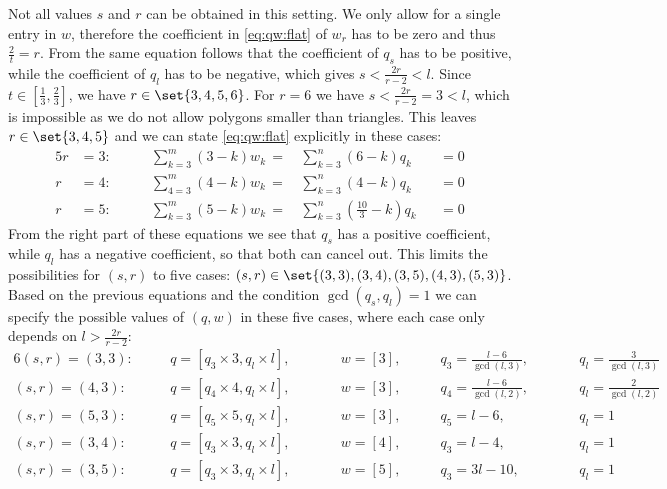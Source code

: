 Not all values $s$ and $r$ can be obtained in this setting. We only allow for a single entry in $w$, therefore the coefficient in \eqref{eq:qw:flat} of $w_r$ has to be zero and thus $\frac{2}{t} = r$. From the same equation follows that the coefficient of $q_s$ has to be positive, while the coefficient of $q_l$ has to be negative, which gives $s < \frac{2r}{r - 2} < l$. Since $t \in \left[\frac{1}{3}, \frac{2}{3}\right]$, we have $r \in \set{3, 4, 5, 6}$. For $r = 6$ we have $s < \frac{2r}{r - 2} = 3 < l$, which is impossible as we do not allow polygons smaller than triangles. This leaves $r \in \set{3, 4, 5}$ and we can state \eqref{eq:qw:flat} explicitly in these cases:
\begin{alignat}{5}
  r &= 3: \qquad &  \sum_{k=3}^m \left(3 - k \right) w_k\,=\,&    \sum_{k=3}^n \left(6 - k \right) q_k &&= 0 \label{eq:flat:3}\\
  r &= 4: \qquad &  \sum_{4=3}^m \left(4 - k \right) w_k\,=\,&    \sum_{k=3}^n \left(4 - k \right) q_k &&= 0  \label{eq:flat:4}\\
  r &= 5: \qquad &  \sum_{k=3}^m \left(5 - k \right) w_k\,=\,&    \sum_{k=3}^n \left( \tfrac{10}{3} - k \right) q_k &&= 0 \label{eq:flat:5}
\end{alignat}
From the right part of these equations we see that $q_s$ has a positive coefficient, while $q_l$ has a negative coefficient, so that both can cancel out. This limits the possibilities for $(s, r)$ to five cases: $(s, r) \in \set{(3, 3), (3, 4), (3, 5), (4, 3), (5, 3)}$. Based on the previous equations and the condition $\gcd(q_s, q_l) = 1$ we can specify the possible values of $(q, w)$ in these five cases, where each case only depends on $l > \frac{2r}{r - 2}$:
\begin{alignat*}{6}
  (s, r) = (3, 3): \quad && q = [q_3 \times 3, q_l \times l],\qquad&&w = [3],\qquad&q_3 = \tfrac{l - 6}{\gcd(l, 3)}, &\qquad&q_l = \tfrac{3}{\gcd(l, 3)} \\
  (s, r) = (4, 3): \quad && q = [q_4 \times 4, q_l \times l],\qquad&&w = [3],\qquad&q_4 = \tfrac{l - 6}{\gcd(l, 2)}, &\qquad&q_l = \tfrac{2}{\gcd(l, 2)} \\
  (s, r) = (5, 3): \quad && q = [q_5 \times 5, q_l \times l],\qquad&&w = [3],\qquad&q_5 = l - 6,                     &\qquad&q_l = 1 \\
  (s, r) = (3, 4): \quad && q = [q_3 \times 3, q_l \times l],\qquad&&w = [4],\qquad&q_3 = l - 4,                     &\qquad&q_l = 1 \\
  (s, r) = (3, 5): \quad && q = [q_3 \times 3, q_l \times l],\qquad&&w = [5],\qquad&q_3 = 3l - 10,                   &\qquad&q_l = 1
\end{alignat*}


